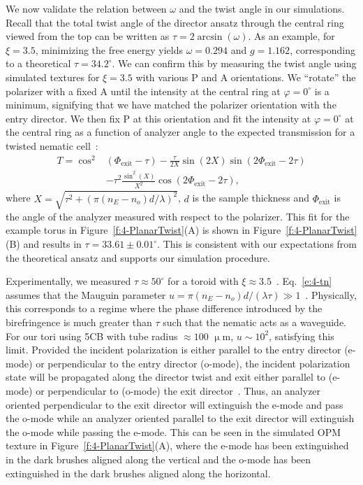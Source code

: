 We now validate the relation between $\omega$ and the twist angle in our simulations.
Recall that the total twist angle of the director ansatz through the central ring viewed from the top can be written as $\tau = 2 \arcsin (\omega)$.
As an example, for $\xi = 3.5$, minimizing the free energy yields $\omega = 0.294$ and $g = 1.162$, corresponding to a theoretical $\tau = 34.2^{\circ}$.
We can confirm this by measuring the twist angle using simulated textures for $\xi=3.5$ with various P and A orientations.
We ``rotate'' the polarizer with a fixed A until the intensity at the central ring at $\varphi=0^{\circ}$ is a minimum, signifying that we have matched the polarizer orientation with the entry director.
We then fix P at this orientation and fit the intensity at $\varphi=0^{\circ}$ at the central ring as a function of analyzer angle to the expected transmission for a twisted nematic cell~\cite{RN232}:
\begin{align}\label{e:4-tn}
T = \cos ^2&(\Phi_{\textrm{exit}}-\tau)-\frac{\tau}{2 X}\sin(2X)\sin(2\Phi_{\textrm{exit}}-2\tau)\nonumber \\
&-\tau ^2\frac{\sin ^2 (X)}{X^2}\cos(2\Phi_{\textrm{exit}}-2\tau),
\end{align}
where $X = \sqrt{\tau^2+(\pi(n_E-n_o)d/\lambda)^2}$, $d$ is the sample thickness and $\Phi_\textrm{exit}$ is the angle of the analyzer measured with respect to the polarizer.
This fit for the example torus in Figure~\ref{f:4-PlanarTwist}(A) is shown in Figure~\ref{f:4-PlanarTwist}(B) and results in $\tau=33.61 \pm 0.01^{\circ}$.
This is consistent with our expectations from the theoretical ansatz and supports our simulation procedure.

Experimentally, we measured $\tau \approx 50^{\circ}$ for a toroid with $\xi \approx 3.5$~\cite{RN24}. Eq.~\ref{e:4-tn} assumes that the Mauguin parameter $u =  \pi (n_E-n_o) d /(\lambda \tau) \gg 1$~\cite{RN232}.
 Physically, this corresponds to a regime where the phase difference introduced by the birefringence is much greater than $\tau$ such that the nematic acts as a waveguide.
For our tori using 5CB with tube radius $\approx 100$ $\upmu$m, $u\sim 10^{2}$, satisfying this limit.
Provided the incident polarization is either parallel to the entry director (e-mode) or perpendicular to the entry director (o-mode), the incident polarization state will be propagated along the director twist and exit either parallel to (e-mode) or perpendicular to (o-mode) the exit director~\cite{RN232}.
Thus, an analyzer oriented perpendicular to the exit director will extinguish the e-mode and pass the o-mode while an analyzer oriented parallel to the exit director will extinguish the o-mode while passing the e-mode.
This can be seen in the simulated OPM texture in Figure~\ref{f:4-PlanarTwist}(A), where the e-mode has been extinguished in the dark brushes aligned along the vertical and the o-mode has been extinguished in the dark brushes aligned along the horizontal.


